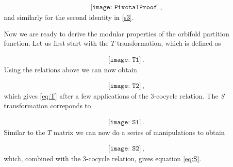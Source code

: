 \documentclass[aps,pra,twocolumn,superscriptaddress,10pt,article,nofootinbib,showpacs]{revtex4-1}
\begin{document}
\begin{align}
\texttt{[image: PivotalProof]}\, ,
\end{align}
and similarly for the second identity in \eqref{s3}.

Now we are ready to derive the modular properties of the orbifold partition function. Let us first start with the $T$ transformation, which is defined as

\begin{align}
\texttt{[image: T1]}\, .
\end{align}
Using the relations above we can now obtain

\begin{align}
\texttt{[image: T2]}\, ,
\end{align}
which gives \eqref{eq:T} after a few applications of the 3-cocycle relation. The $S$ transformation correponds to

\pagebreak


\begin{align}
\texttt{[image: S1]}\, .
\end{align}
Similar to the $T$ matrix we can now do a series of manipulations to obtain

\begin{align}
\texttt{[image: S2]}\, ,
\end{align}
which, combined with the 3-cocycle relation, gives equation \eqref{eq:S}.
\end{document}
